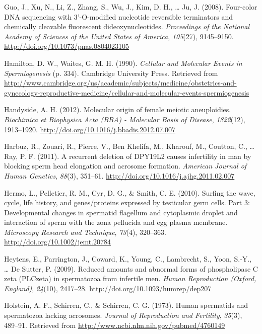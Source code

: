\documentclass[12pt,twoside]{reedthesis}
\theoremstyle{definition}
\theoremstyle{definition}
\theoremstyle{remark}
\begin{document}
  \hypertarget{ref-Guo2008}{}
  Guo, J., Xu, N., Li, Z., Zhang, S., Wu, J., Kim, D. H., \ldots{} Ju, J.
  (2008). Four-color DNA sequencing with 3'-O-modified nucleotide
  reversible terminators and chemically cleavable fluorescent
  dideoxynucleotides. \emph{Proceedings of the National Academy of
  Sciences of the United States of America}, \emph{105}(27), 9145--9150.
  \url{http://doi.org/10.1073/pnas.0804023105}
  
  \hypertarget{ref-Hamilton1987}{}
  Hamilton, D. W., Waites, G. M. H. (1990). \emph{Cellular and Molecular
  Events in Spermiogenesis} (p. 334). Cambridge University Press.
  Retrieved from
  \url{http://www.cambridge.org/us/academic/subjects/medicine/obstetrics-and-gynecology-reproductive-medicine/cellular-and-molecular-events-spermiogenesis}
  
  \hypertarget{ref-Handyside2012}{}
  Handyside, A. H. (2012). Molecular origin of female meiotic
  aneuploidies. \emph{Biochimica et Biophysica Acta (BBA) - Molecular
  Basis of Disease}, \emph{1822}(12), 1913--1920.
  \url{http://doi.org/10.1016/j.bbadis.2012.07.007}
  
  \hypertarget{ref-Harbuz2011}{}
  Harbuz, R., Zouari, R., Pierre, V., Ben Khelifa, M., Kharouf, M.,
  Coutton, C., \ldots{} Ray, P. F. (2011). A recurrent deletion of DPY19L2
  causes infertility in man by blocking sperm head elongation and acrosome
  formation. \emph{American Journal of Human Genetics}, \emph{88}(3),
  351--61. \url{http://doi.org/10.1016/j.ajhg.2011.02.007}
  
  \hypertarget{ref-Hermo2010}{}
  Hermo, L., Pelletier, R. M., Cyr, D. G., \& Smith, C. E. (2010). Surfing
  the wave, cycle, life history, and genes/proteins expressed by
  testicular germ cells. Part 3: Developmental changes in spermatid
  flagellum and cytoplasmic droplet and interaction of sperm with the zona
  pellucida and egg plasma membrane. \emph{Microscopy Research and
  Technique}, \emph{73}(4), 320--363.
  \url{http://doi.org/10.1002/jemt.20784}
  
  \hypertarget{ref-Heytens2009}{}
  Heytens, E., Parrington, J., Coward, K., Young, C., Lambrecht, S., Yoon,
  S.-Y., \ldots{} De Sutter, P. (2009). Reduced amounts and abnormal forms
  of phospholipase C zeta (PLCzeta) in spermatozoa from infertile men.
  \emph{Human Reproduction (Oxford, England)}, \emph{24}(10), 2417--28.
  \url{http://doi.org/10.1093/humrep/dep207}
  
  \hypertarget{ref-Holstein1973}{}
  Holstein, A. F., Schirren, C., \& Schirren, C. G. (1973). Human
  spermatids and spermatozoa lacking acrosomes. \emph{Journal of
  Reproduction and Fertility}, \emph{35}(3), 489--91. Retrieved from
  \url{http://www.ncbi.nlm.nih.gov/pubmed/4760149}
  
\end{document}
